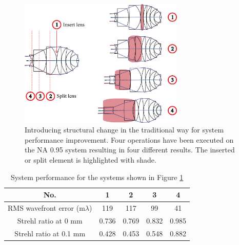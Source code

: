 \begin{figure}[h!]
    \centering
    \includegraphics[width=0.7\textwidth]{chapter-4/figures/Vollrath_NATradition.png}
    \caption{Introducing structural change in the traditional way for system performance improvement. Four operations have been executed on the NA 0.95 system resulting in four different results. The inserted or split element is highlighted with shade.}
    \label{fig: vollrathNAtrad}
\end{figure}

\setlength{\arrayrulewidth}{.5mm}
\setlength{\tabcolsep}{18pt}
\renewcommand{\arraystretch}{1.2}
\begin{table}[h!]
    \centering
    \captionsetup{justification=centering}
    \caption{System performance for the systems shown in Figure \ref{fig: vollrathNAtrad}}
    \label{table: vollrathNAtrad}
    \vspace{-1em}
    \begin{adjustbox}{max width=\textwidth, center}
    \begin{tabular}{c c c c c}
    \hline 
     No. & \textbf{1} & \textbf{2} & \textbf{3} & \textbf{4}\\ 
     \midrule
    RMS wavefront error (m$\lambda$) & 119 & 117 & 99 & 41 \\ 
    Strehl ratio at 0 mm & 0.736 & 0.769 & 0.832 & 0.985\\
    Strehl ratio at 0.1 mm & 0.428 & 0.453 & 0.548 & 0.882\\
    \hline
    \end{tabular}
    \end{adjustbox}
\end{table}


